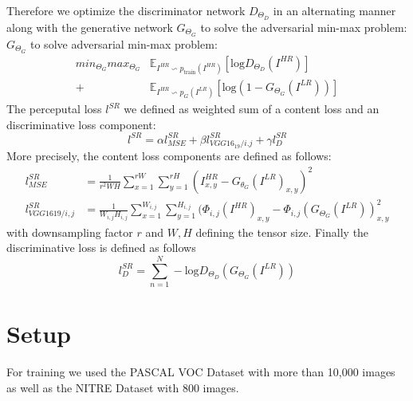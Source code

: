 \documentclass[10pt,twocolumn,letterpaper]{article}
\begin{document}
Therefore we optimize the discriminator network $D_{\Theta_D}$ in an
alternating manner along with the generative network $G_{\Theta_G}$ to
solve the adversarial min-max problem:\\
$G_{\Theta_G}$ to solve adversarial min-max problem:
\begin{align*}
  min_{\Theta_G} max_{\Theta_G} &\mathbb{E}_{I^{HR} \backsim p_{\text{train}}(I^{HR})} [\text{log} D_{\Theta_D}(I^{HR})] \\
  +&\mathbb{E}_{I^{HR} \backsim p_G(I^{LR})} [\text{log} (1-G_{\Theta_G}(I^{LR}))]
\end{align*}
The perceputal loss $l^{SR}$ we defined as weighted sum of a content loss and an discriminative loss component:\\
\begin{equation*}
  l^{SR}=\alpha l^{SR}_{MSE} + \beta l^{SR}_{VGG16_19/i.j} + \gamma l^{SR}_{D}
\end{equation*}
More precisely, the content loss components are defined as follows:
\begin{align*}
  l^{SR}_{M SE}       &= \frac{1}{r^2WH}\sum_{x=1}^{rW}\sum_{y=1}^{rH}(I^{HR}_{x,y}-G_{\theta_G}(I^{LR})_{x,y})^2 \\
  l^{SR}_{VGG1619/i,j}&=\frac{1}{W_{i,j}H_{i,j}} \sum_{x=1}^{W_{i,j}}\sum_{y=1}^{H_{i,j}}(\Phi_{i,j}(I^{HR})_{x,y}-\Phi_{i,j}(G_{\Theta_G}(I^{LR}))_{x,y}^2
\end{align*}
with downsampling factor $r$ and $W,H$ defining the tensor size.
Finally the discriminative loss is defined as follows
\begin{equation*}  
  l^{SR}_{D}=\sum_{n=1}^N -\text{log}D_{\Theta_D}(G_{\Theta_G}(I^{LR}))
\end{equation*}
\section{Setup}
\label{sec:setup}



For training we used the PASCAL VOC Dataset\cite{pascal-voc-2012} with
more than 10,000 images as well as the NITRE
Dataset\cite{Agustsson_2017_CVPR_Workshops} with 800 images.

\end{document}
